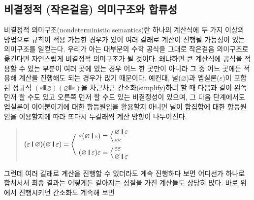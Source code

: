 \subsection{비결정적 (작은걸음) 의미구조와 합류성}
%
%
비결정적 의미구조(nondeterministic semantics)란 하나의 계산식에
두 가지 이상의 방법으로 규칙이 적용 가능한 경우가 있어 여러 갈래로
계산이 진행될 가능성이 있는 의미구조를 일컫는다. 우리가 아는
대부분의 수학 공식을 그대로 작은걸음 의미구조로 옮긴다면 자연스럽게
비결정적 의미구조가 될 것이다. 왜냐하면 큰 계산식에 공식을 적용할 수 있는
부분이 여러 곳에 있는 경우 어느 한 곳만이 아니라 그 중 어느 곳에든
적용해 계산을 진행해도 되는 경우가 많기 때문이다. 예컨대,
널($\varnothing$)과 엡실론($\varepsilon$)이 포함된 정규식
$(\varepsilon\VERT \varnothing)(\varnothing\VERT \varepsilon)$을
차근차근 간소화(simplify)하려 할 때 다음과 같이 왼쪽 먼저 할 수도 있고
오른쪽 먼저 할 수도 있는 비결정성이 있으며, 그 다음 단계에서도
엡실론이 이어붙이기에 대한 항등원임을 활용할지 아니면
널이 합집합에 대한 항등원임을 이용할지에 따라 또다시
두갈래씩 계산 방향이 나누어진다.
\begin{quote}
\(
(\varepsilon\VERT \varnothing)(\varnothing\VERT \varepsilon) =
\left<\phantom{\begin{array}{l}.\\[4ex].\end{array}}\hspace*{-4ex}\right.
\begin{array}{l}
  \varepsilon(\varnothing\VERT \varepsilon) =
     \Big<\hspace*{-1ex}
     \begin{array}{l}
       \varnothing\VERT \varepsilon \\
       \varepsilon\varepsilon
     \end{array}
  \\[1ex]
  (\varnothing\VERT \varepsilon)\varepsilon =
     \Big<\hspace*{-1ex}
     \begin{array}{l}
      \varepsilon\varepsilon  \\
      \varnothing\VERT \varepsilon
     \end{array}
\end{array}
\)
\end{quote}
그런데 여러 갈래로 계산을 진행할 수 있더라도 계속 진행하다 보면
어디선가 하나로 합쳐서서 최종 결과는 어떻게든 같아지는 성질을 가진
계산들도 상당히 많다. 바로 위에서 진행시키던 간소화도 계속해 보면
